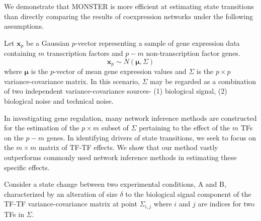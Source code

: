 \documentclass[9pt,twocolumn,twoside]{pnas-new}
\begin{document}
We demonstrate that MONSTER is more efficient at estimating state transitions than directly comparing the results of coexpression networks under the following assumptions.

Let $\mathbf{x}_{p}$ be a Gaussian $p$-vector representing a sample
of gene expression data containing $m$ transcription factors and
$p-m$ non-transcription factor genes. 
\[
\mathbf{x}_{p}\sim N\left(\mathbf{\mu},\Sigma\right)
\]
where $\mathbf{\mu}$ is the $p$-vector of mean gene expression values
and $\Sigma$ is the $p\times p$ variance-covariance matrix. In this
scenario, $\Sigma$ may be regarded as a combination of two independent
variance-covariance sources- (1) biological signal, (2) biological
noise and technical noise.

In investigating gene regulation, many network inference methods are
constructed for the estimation of the $p\times m$ subset of $\Sigma$
pertaining to the effect of the $m$ TFs on the $p-m$ genes. In identifying
drivers of state transitions, we seek to focus on the $m\times m$
matrix of TF-TF effects. We show that our method vastly outperforms
commonly used network inference methods in estimating these specific
effects.

Consider a state change between two experimental conditions, A and
B, characterized by an alteration of size $\delta$ to the biological
signal component of the TF-TF variance-covariance matrix at point
$\Sigma_{i,j}$ where $i$ and $j$ are indices for two TFs in $\Sigma$.
\end{document}

